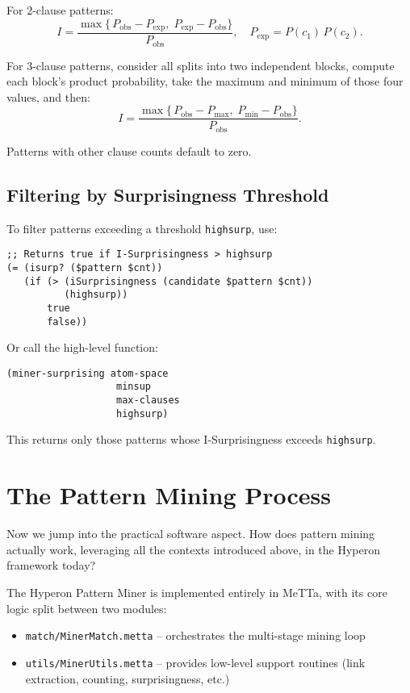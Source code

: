 \documentclass{article}
\begin{document}
For 2-clause patterns:
\[
  I = \frac{\max\{\,P_{\mathrm{obs}}-P_{\mathrm{exp}},\;P_{\mathrm{exp}}-P_{\mathrm{obs}}\}}{P_{\mathrm{obs}}},
  \quad
  P_{\mathrm{exp}} = P(c_{1})\,P(c_{2}).
\]

For 3-clause patterns, consider all splits into two independent blocks, compute each block's product probability, take the maximum and minimum of those four values, and then:
\[
  I = \frac{\max\{\,P_{\mathrm{obs}}-P_{\mathrm{max}},\;P_{\mathrm{min}}-P_{\mathrm{obs}}\}}{P_{\mathrm{obs}}}.
\]

Patterns with other clause counts default to zero.

\subsection{Filtering by Surprisingness Threshold}

To filter patterns exceeding a threshold \texttt{highsurp}, use:

\begin{verbatim}
;; Returns true if I-Surprisingness > highsurp
(= (isurp? ($pattern $cnt))
   (if (> (iSurprisingness (candidate $pattern $cnt))
          (highsurp))
       true
       false))
\end{verbatim}

Or call the high-level function:

\begin{verbatim}
(miner-surprising atom-space
                   minsup
                   max-clauses
                   highsurp)
\end{verbatim}

This returns only those patterns whose I-Surprisingness exceeds \texttt{highsurp}.


\section{The Pattern Mining Process}

Now we jump into the practical software aspect.   How does pattern mining actually work, leveraging all the contexts introduced above, in the Hyperon framework today?

The Hyperon Pattern Miner is implemented entirely in MeTTa, with its core logic split between two modules:

\begin{itemize}
  \item \texttt{match/MinerMatch.metta} -- orchestrates the multi-stage mining loop
  \item \texttt{utils/MinerUtils.metta} -- provides low-level support routines (link extraction, counting, surprisingness, etc.)
\end{itemize}
\end{document}
